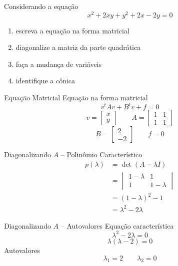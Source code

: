 
\begin{question}
  Considerando a equação
  \[
    x^2+2xy+y^2+2x-2y=0
  \]
  \vspace{-\baselineskip}
  \begin{enumerate}
    \item escreva a equação na forma matricial
    \item diagonalize a matriz da parte quadrática
    \item faça a mudança de variáveis
    \item identifique a cônica
  \end{enumerate}
\end{question}

\begin{resolution}{Equação Matricial}
  Equação na forma matricial
  \[
    v^tAv+B^tv+f=0
  \]
  \[
    v=\begin{bmatrix}x\\y\end{bmatrix}
    \qquad
    A=\begin{bmatrix}
      1&1\\
      1&1
    \end{bmatrix}
  \]
  \[
    B=\begin{bmatrix}2\\-2\end{bmatrix}
    \qquad
    f=0
  \]
\end{resolution}

\begin{resolution}{Diagonalizando $A$ -- Polinômio Característico}
  \begin{align*}
    p(\lambda)
    & = \det(A-\lambda I)
    \\
    & = \begin{vmatrix}
      1-\lambda&1\\
      1&1-\lambda
    \end{vmatrix}
    \\
    & = (1-\lambda)^2-1
    \\
    & = \lambda^2-2\lambda
  \end{align*}
\end{resolution}

\begin{resolution}{Diagonalizando $A$ -- Autovalores}
  Equação característica
  \[
    \lambda^2-2\lambda=0
  \]
  \[
    \lambda(\lambda-2)=0
  \]
  Autovalores
  \[
    \lambda_1=2
    \qquad
    \lambda_2=0
  \]
\end{resolution}


